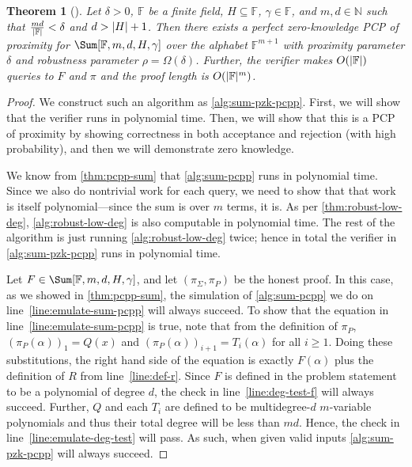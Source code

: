 \documentclass[english,12pt]{reedthesis}
\theoremstyle{plain}
\newtheorem{thm}{Theorem}[section]
\theoremstyle{definition}
\theoremstyle{remark}
\DeclarePairedDelimiter{\abs}{\lvert}{\rvert}
\begin{document}
\begin{thm}[{\cite[Lemma 5.1]{GOS25}}]\label{thm:pcpp-sum-pzk}
  Let $\delta > 0$, $\mathbb{F}$ be a finite field, $H \subseteq \mathbb{F}$,
  $\gamma \in \mathbb{F}$, and $m, d \in \mathbb{N}$ such that $\frac{md}{\abs{\mathbb{F}}} < \delta$
  and $d > \abs{H} + 1$. Then there exists a perfect zero-knowledge PCP of
  proximity for $\Sum[\mathbb{F}, m, d, H, \gamma]$ over the alphabet
  $\mathbb{F}^{m+1}$ with proximity parameter $\delta$ and robustness parameter
  $\rho = \Omega(\delta)$. Further, the verifier makes $O(\abs{\mathbb{F}})$ queries to $F$
  and $\pi$ and the proof length is $O(\abs{\mathbb{F}}^{m})$.
\end{thm}

\begin{proof}
  We construct such an algorithm as \cref{alg:sum-pzk-pcpp}. First, we will show
  that the verifier runs in polynomial time. Then, we will show that this is a
  PCP of proximity by showing correctness in both acceptance and rejection (with
  high probability), and then we will demonstrate zero
  knowledge.

  We know from \cref{thm:pcpp-sum} that \cref{alg:sum-pcpp} runs in polynomial
  time. Since we also do nontrivial work for each query, we need to show that
  that work is itself polynomial---since the sum is over $m$ terms, it is. As per
  \cref{thm:robust-low-deg}, \cref{alg:robust-low-deg} is also computable in
  polynomial time. The rest of the algorithm is just running
  \cref{alg:robust-low-deg} twice; hence in total the verifier in
  \cref{alg:sum-pzk-pcpp} runs in polynomial time.

  Let $F \in \Sum[\mathbb{F}, m, d, H, \gamma]$, and let $(\pi_{\Sigma}, \pi_{P})$ be the honest
  proof. In this case, as we showed in \cref{thm:pcpp-sum}, the simulation of
  \cref{alg:sum-pcpp} we do on line~\ref{line:emulate-sum-pcpp} will always
  succeed. To show that the equation in line~\ref{line:emulate-sum-pcpp} is
  true, note that from the definition of $\pi_{P}$, $(\pi_{P}(\alpha))_{1} = Q(x)$ and
  $(\pi_{P}(\alpha))_{i+1} = T_{i}(\alpha)$ for all $i \ge 1$. Doing these substitutions, the
  right hand side of the equation is exactly $F(\alpha)$ plus the definition of $R$
  from line~\ref{line:def-r}. Since $F$ is defined in the problem statement to
  be a polynomial of degree $d$, the check in line~\ref{line:deg-test-f} will
  always succeed. Further, $Q$ and each $T_{i}$ are defined to be
  multidegree-$d$ $m$-variable polynomials and thus their total degree will be
  less than $md$. Hence, the check in line~\ref{line:emulate-deg-test} will
  pass. As such, when given valid inputs \cref{alg:sum-pzk-pcpp} will always
  succeed.


\end{proof}
\end{document}
